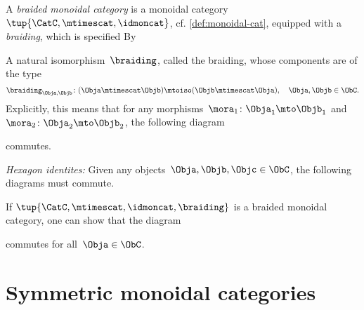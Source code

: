 \begin{ctdefinition}
    \label{def:braided_moncat}
    A \emph{braided monoidal category} is a monoidal category~$\tup{\CatC,\mtimescat,\idmoncat}$,  cf. \cref{def:monoidal-cat}, equipped with a \emph{braiding}, which is specified By

    \constit
    \begin{compactenum}
        \item A natural isomorphism~$\braiding$, called the braiding, whose components are of the type
        \begin{equation}
            \label{eq:braiding_symmetry}
            \braiding_{\Obja,\Objb}\colon (\Obja\mtimescat \Objb)\mtoiso (\Objb\mtimescat \Obja), \quad \Obja,\Objb \in \ObC.
        \end{equation}
        Explicitly, this means that for any morphisms~$\mora_1\colon \Obja_1\mto \Objb_1$ and~$\mora_2\colon \Obja_2\mto \Objb_2$, the following diagram
        \begin{center}
        \end{center}
        commutes.
    \end{compactenum}

    \condit
    \begin{compactenum}
        \item \emph{Hexagon identites:} Given any objects~$\Obja,\Objb,\Objc\in \ObC$, the following diagrams must commute.
    \end{compactenum}
    \begin{center}
    \end{center}
    \begin{center}
    \end{center}
\end{ctdefinition}

\begin{remark}
    If $\tup{\CatC,\mtimescat,\idmoncat, \braiding}$ is a braided monoidal category, one can show that the diagram
    \begin{center}
    \end{center}
    commutes for all~$\Obja \in \ObC$.
\end{remark}


\section{Symmetric monoidal categories}

